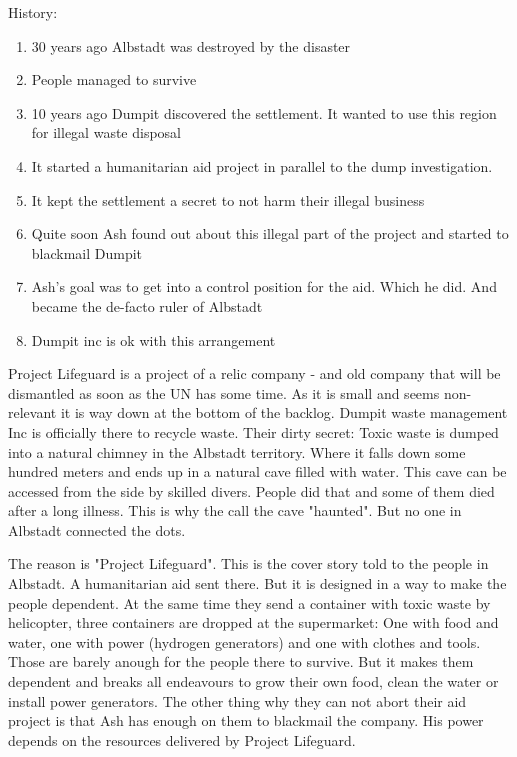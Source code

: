 History:
\begin{enumerate}
    \item 30 years ago Albstadt was destroyed by the disaster
    \item People managed to survive
    \item 10 years ago Dumpit discovered the settlement. It wanted to use this region for illegal waste disposal
    \item It started a humanitarian aid project in parallel to the dump investigation.
    \item It kept the settlement a secret to not harm their illegal business
    \item Quite soon Ash found out about this illegal part of the project and started to blackmail Dumpit
    \item Ash's goal was to get into a control position for the aid. Which he did. And became the de-facto ruler of Albstadt
    \item Dumpit inc is ok with this arrangement
\end{enumerate}

Project Lifeguard is a project of a relic company - and old company that will be dismantled as soon as the UN has some time. As it is small and seems non-relevant it is way down at the bottom of the backlog.
Dumpit waste management Inc is officially there to recycle waste. Their dirty secret: Toxic waste is dumped into a natural chimney in the Albstadt territory. Where it falls down some hundred meters and ends up in a natural cave filled with water. This cave can be accessed from the side by skilled divers. People did that and some of them died after a long illness. This is why the call the cave "haunted". But no one in Albstadt connected the dots.

The reason is "Project Lifeguard". This is the cover story told to the people in Albstadt. A humanitarian aid sent there. But it is designed in a way to make the people dependent. At the same time they send a container with toxic waste by helicopter, three containers are dropped at the supermarket: One with food and water, one with power (hydrogen generators) and one with clothes and tools.
Those are barely anough for the people there to survive. But it makes them dependent and breaks all endeavours to grow their own food, clean the water or install power generators.
The other thing why they can not abort their aid project is that Ash has enough on them to blackmail the company. His power depends on the resources delivered by Project Lifeguard.

